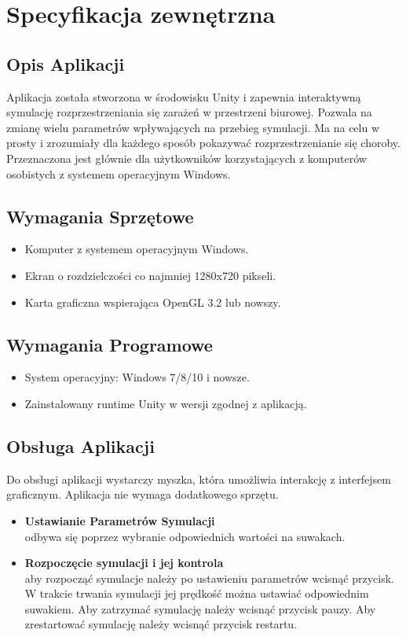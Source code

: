 \chapter{Specyfikacja zewnętrzna}
\label{ch:04}

\section{Opis Aplikacji}

Aplikacja została stworzona w środowisku Unity i zapewnia interaktywną symulację rozprzestrzeniania się zarażeń w przestrzeni biurowej. Pozwala na zmianę wielu parametrów wpływających na przebieg symulacji. Ma na celu w prosty i zrozumiały dla każdego sposób pokazywać rozprzestrzenianie się choroby. Przeznaczona jest głównie dla użytkowników korzystających z komputerów osobistych z systemem operacyjnym Windows.

\section{Wymagania Sprzętowe}

\begin{itemize}
	\item Komputer z systemem operacyjnym Windows.
	\item Ekran o rozdzielczości co najmniej 1280x720 pikseli.
	\item Karta graficzna wspierająca OpenGL 3.2 lub nowszy.
\end{itemize}

\section{Wymagania Programowe}

\begin{itemize}
	\item System operacyjny: Windows 7/8/10 i nowsze.
	\item Zainstalowany runtime Unity w wersji zgodnej z aplikacją.
\end{itemize}

\section{Obsługa Aplikacji}

Do obsługi aplikacji wystarczy myszka, która umożliwia interakcję z interfejsem graficznym. Aplikacja nie wymaga dodatkowego sprzętu.
\begin{itemize}
	\item \textbf{Ustawianie Parametrów Symulacji}\\
			odbywa się poprzez wybranie odpowiednich wartości na suwakach.
	\item \textbf{Rozpoczęcie symulacji i jej kontrola}\\
			aby rozpocząć symulacje należy po ustawieniu parametrów wcisnąć przycisk. W trakcie trwania symulacji jej prędkość można ustawiać odpowiednim suwakiem. Aby zatrzymać symulację należy wcisnąć przycisk pauzy. Aby zrestartować symulację należy wcisnąć przycisk restartu.
\end{itemize}

